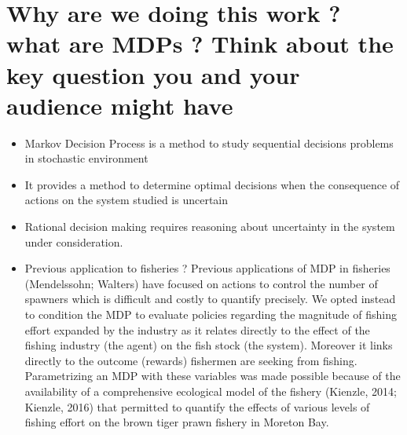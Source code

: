 \documentclass[11pt]{article}
\begin{document}
\section{Why are we doing this work ? what are MDPs ? Think about the key question you and your audience might have}

  
\begin{itemize}

\item Markov Decision Process is a method to study sequential decisions problems in stochastic environment
\item It provides a method to determine optimal decisions when the consequence of actions on the system studied is uncertain
\item Rational decision making requires reasoning about uncertainty in the system under consideration.
\item Previous application to fisheries ? Previous applications of MDP in fisheries (Mendelssohn; Walters) have focused on actions to control the number of spawners which is difficult and costly to quantify precisely. We opted instead to condition the MDP to evaluate policies regarding the magnitude of fishing effort expanded by the industry as it relates directly to the effect of the fishing industry (the agent) on the fish stock (the system). Moreover it links directly to the outcome (rewards) fishermen are seeking from fishing. Parametrizing an MDP with these variables was made possible because of the availability of a comprehensive ecological model of the fishery (Kienzle, 2014; Kienzle, 2016) that permitted to quantify the effects of various levels of fishing effort on the brown tiger prawn fishery in Moreton Bay.

\end{itemize}

\end{document}
